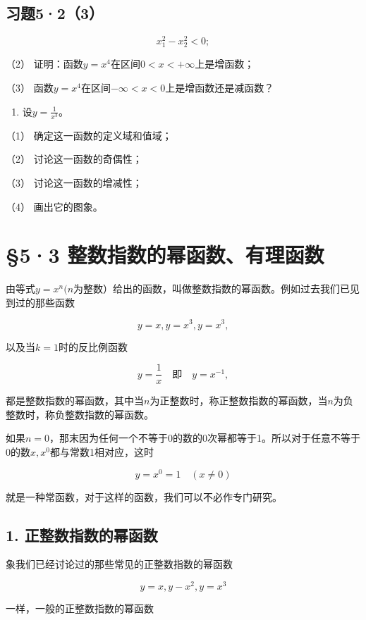 \subsection{习题5·2（3）}

\[
x_{1}^{2} - x_{2}^{2} < 0;
\]

（2） 证明：函数\(y = x^4\)在区间\(0 < x < +\infty\)上是增函数；

（3） 函数\(y = x^4\)在区间\(-\infty < x < 0\)上是增函数还是减函数？

\begin{enumerate}[start=3]
\item
  设\(y = \frac{1}{x^3}\)。
\end{enumerate}

（1） 确定这一函数的定义域和值域；

（2） 讨论这一函数的奇偶性；

（3） 讨论这一函数的增减性；

（4） 画出它的图象。

\section{§5·3 整数指数的幂函数、有理函数}

由等式\(y = x^n (n\)为整数）给出的函数，叫做整数指数的幂函数。例如过去我们已见到过的那些函数

\[
y = x, y = x^{3}, y = x^{3},
\]

以及当\(k = 1\)时的反比例函数

\[
y = \frac{1}{x} \quad \text{即} \quad y = x^{- 1},
\]

都是整数指数的幂函数，其中当\(n\)为正整数时，称正整数指数的幂函数，当\(n\)为负整数时，称负整数指数的幂函数。

如果\(n = 0\)，那末因为任何一个不等于0的数的0次幂都等于1。所以对于任意不等于0的数\(x, x^0\)都与常数1相对应，这时

\[
y = x^{0} = 1 \quad (x \neq 0)
\]

就是一种常函数，对于这样的函数，我们可以不必作专门研究。

\subsection{1. 正整数指数的幂函数}

象我们已经讨论过的那些常见的正整数指数的幂函数

\[
y = x, y - x^{2}, y = x^{3}
\]

一样，一般的正整数指数的幂函数

